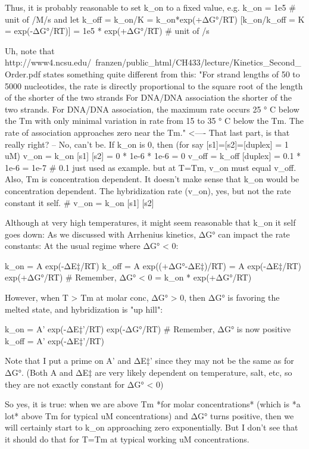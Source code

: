 Thus, it is probably reasonable to set k_on to a fixed value, e.g.
    k_on = 1e5 # unit of /M/s
and let
    k_off = k_on/K = k_on*exp(+ΔG°/RT)          [k_on/k_off = K = exp(-ΔG°/RT)]
          = 1e5 * exp(+ΔG°/RT)  # unit of /s


Uh, note that http://www4.ncsu.edu/~franzen/public_html/CH433/lecture/Kinetics_Second_Order.pdf
states something quite different from this:
    "For strand lengths of 50 to 5000 nucleotides, the rate is
    directly proportional to the square root of the length of the
    shorter of the two strands For DNA/DNA association the shorter of the two strands. For DNA/DNA association, the
    maximum rate occurs 25 ° C below the Tm with only minimal
    variation in rate from 15 to 35 ° C below the Tm.
    The rate of association approaches zero near the Tm." <---- That last part, is that really right?
    -- No, can't be. If k_on is 0, then  (for say [s1]=[s2]=[duplex] = 1 uM)
        v_on  = k_on  [s1] [s2]  = 0 * 1e-6 * 1e-6 = 0
        v_off = k_off [duplex]   = 0.1 * 1e-6 = 1e-7        # 0.1 just used as example.
       but at T=Tm, v_on must equal v_off.
    Also, Tm is concentration dependent.
    It doesn't make sense that k_on would be concentration dependent.
    The hybridization rate (v_on), yes, but not the rate constant it self.  # v_on  = k_on  [s1] [s2]

    Although at very high temperatures, it might seem reasonable that k_on it self goes down:
    As we discussed with Arrhenius kinetics, ΔG° can impact the rate constants:
    At the usual regime where ΔG° < 0:

        k_on  = A exp(-ΔE‡/RT)
        k_off = A exp((+ΔG°-ΔE‡)/RT) = A exp(-ΔE‡/RT) exp(+ΔG°/RT)      # Remember, ΔG° < 0
              = k_on * exp(+ΔG°/RT)

    However, when T > Tm at molar conc, ΔG° > 0,
    then ΔG° is favoring the melted state, and hybridization is "up hill":

        k_on  = A' exp(-ΔE‡'/RT) exp(-ΔG°/RT)                           # Remember, ΔG° is now positive
        k_off = A' exp(-ΔE‡'/RT)

    Note that I put a prime on A' and ΔE‡' since they may not be the same as for ΔG°.
    (Both A and ΔE‡ are very likely dependent on temperature, salt, etc, so they are not exactly constant for ΔG° < 0)

    So yes, it is true: when we are above Tm *for molar concentrations* (which is *a lot*
    above Tm for typical uM concentrations) and ΔG° turns positive, then
    we will certainly start to k_on approaching zero exponentially.
    But I don't see that it should do that for T=Tm at typical working uM concentrations.



